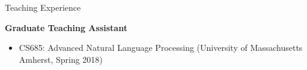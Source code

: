 \documentclass{resume} %
\begin{document}
\begin{rSection}{Teaching Experience}


\textbf{Graduate Teaching Assistant}
\begin{itemize}
\item CS685: Advanced Natural Language Processing (University of Massachusetts Amherst, Spring 2018)
\end{itemize}






\end{rSection}
\end{document}
